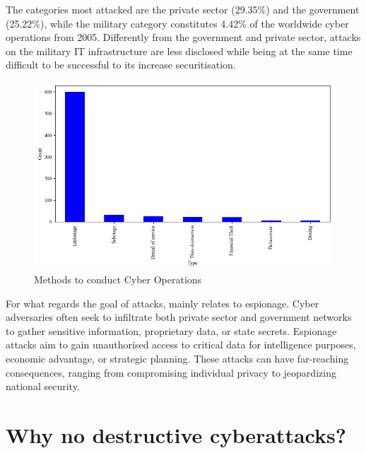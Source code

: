 The categories most attacked are the private sector (29.35\%) and the government (25.22\%), while the military category constitutes 4.42\% of the worldwide cyber operations from 2005. Differently from the government and private sector, attacks on the military IT infrastructure are less disclosed while being at the same time difficult to be successful to its increase securitisation. 

\begin{figure}[H]
    \centering
    \includegraphics[width=\textwidth]{Images/top10type.png}
    \caption{Methods to conduct Cyber Operations}
    \label{fig:top10type}
\end{figure}

For what regards the goal of attacks, mainly relates to espionage. Cyber adversaries often seek to infiltrate both private sector and government networks to gather sensitive information, proprietary data, or state secrets. Espionage attacks aim to gain unauthorised access to critical data for intelligence purposes, economic advantage, or strategic planning. These attacks can have far-reaching consequences, ranging from compromising individual privacy to jeopardizing national security. 

\section{Why no destructive cyberattacks? }

